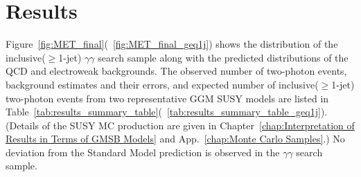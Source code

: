 \documentclass[dissertation.tex]{subfiles}
\begin{document}
%
%

\section{Results}
\label{sec:Results}

Figure~\ref{fig:MET_final}(~\ref{fig:MET_final_geq1j}) shows the \MET distribution of the inclusive($\geq$1-jet) $\gamma\gamma$ search sample along with the predicted \MET distributions of the QCD and electroweak backgrounds.  The observed number of two-photon events, background estimates and their errors, and expected number of inclusive($\geq$1-jet) two-photon events from two representative GGM SUSY models are listed in Table~\ref{tab:results_summary_table}(~\ref{tab:results_summary_table_geq1j}).  (Details of the SUSY MC production are given in Chapter~\ref{chap:Interpretation of Results in Terms of GMSB Models} and App.~\ref{chap:Monte Carlo Samples}.)  No deviation from the Standard Model prediction is observed in the $\gamma\gamma$ search sample.
\end{document}
